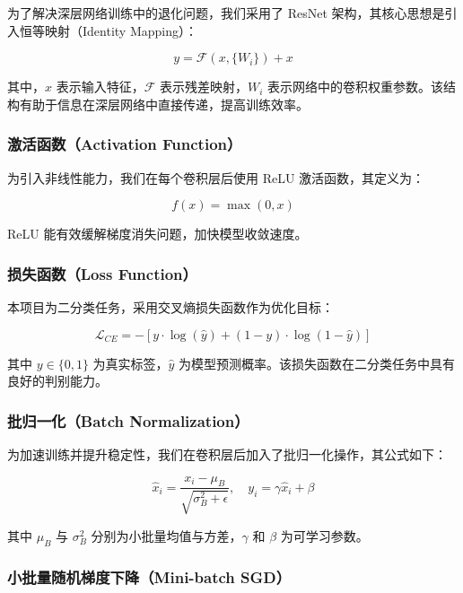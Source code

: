 \documentclass[10.5pt,compsoc]{CjC}
\theoremstyle{mystyle}
\begin{document}
\begin{CJK*}{GBK}{song}
为了解决深层网络训练中的退化问题，我们采用了 ResNet 架构，其核心思想是引入恒等映射（Identity Mapping）：

\begin{equation}
y = \mathcal{F}(x, \{W_i\}) + x
\end{equation}

其中，$x$ 表示输入特征，$\mathcal{F}$ 表示残差映射，$W_i$ 表示网络中的卷积权重参数。该结构有助于信息在深层网络中直接传递，提高训练效率。

\subsubsection{激活函数（Activation Function）}

为引入非线性能力，我们在每个卷积层后使用 ReLU 激活函数，其定义为：

\begin{equation}
f(x) = \max(0, x)
\end{equation}

ReLU 能有效缓解梯度消失问题，加快模型收敛速度。

\subsubsection{损失函数（Loss Function）}

本项目为二分类任务，采用交叉熵损失函数作为优化目标：

\begin{equation}
\mathcal{L}_{CE} = - \left[ y \cdot \log(\hat{y}) + (1 - y) \cdot \log(1 - \hat{y}) \right]
\end{equation}

其中 $y \in \{0, 1\}$ 为真实标签，$\hat{y}$ 为模型预测概率。该损失函数在二分类任务中具有良好的判别能力。

\subsubsection{批归一化（Batch Normalization）}

为加速训练并提升稳定性，我们在卷积层后加入了批归一化操作，其公式如下：

\begin{equation}
\hat{x}_i = \frac{x_i - \mu_B}{\sqrt{\sigma_B^2 + \epsilon}}, \quad y_i = \gamma \hat{x}_i + \beta
\end{equation}

其中 $\mu_B$ 与 $\sigma_B^2$ 分别为小批量均值与方差，$\gamma$ 和 $\beta$ 为可学习参数。

\subsubsection{小批量随机梯度下降（Mini-batch SGD）}


\end{CJK*}
\end{document}
